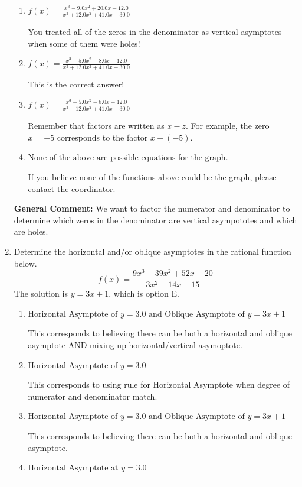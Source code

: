 \documentclass{extbook}[14pt]
\newcommand{\litem}[1]{\item #1

\rule{\textwidth}{0.4pt}}
\begin{document}
\begin{enumerate}
{\begin{enumerate}[label=\Alph*.]
You treated all of the zeros in the denominator as vertical asmptotes when some of them were holes and wrote factors as $x+z$.
\item \( f(x)=\frac{x^{3} -9.0 x^{2} +20.0 x -12.0}{x^{3} +12.0 x^{2} +41.0 x + 30.0} \)

You treated all of the zeros in the denominator as vertical asymptotes when some of them were holes!
\item \( f(x)=\frac{x^{3} +5.0 x^{2} -8.0 x -12.0}{x^{3} +12.0 x^{2} +41.0 x + 30.0} \)

This is the correct answer!
\item \( f(x)=\frac{x^{3} -5.0 x^{2} -8.0 x + 12.0}{x^{3} -12.0 x^{2} +41.0 x -30.0} \)

Remember that factors are written as $x-z$. For example, the zero $x=-5$ corresponds to the factor $x-(-5)$.
\item \( \text{None of the above are possible equations for the graph.} \)

If you believe none of the functions above could be the graph, please contact the coordinator.
\end{enumerate}

\textbf{General Comment:} We want to factor the numerator and denominator to determine which zeros in the denominator are vertical asympototes and which are holes.
}
\litem{
Determine the horizontal and/or oblique asymptotes in the rational function below.
\[ f(x) = \frac{9x^{3} -39 x^{2} +52 x -20}{3x^{2} -14 x + 15} \]The solution is \( y = 3x + 1 \), which is option E.\begin{enumerate}[label=\Alph*.]
\item \( \text{Horizontal Asymptote of } y = 3.0 \text{ and Oblique Asymptote of } y = 3x + 1 \)

This corresponds to believing there can be both a horizontal and oblique asymptote AND mixing up horizontal/vertical asymoptote.
\item \( \text{Horizontal Asymptote of } y = 3.0  \)

This corresponds to using rule for Horizontal Asymptote when degree of numerator and denominator match.
\item \( \text{Horizontal Asymptote of } y = 3.0 \text{ and Oblique Asymptote of } y = 3x + 1 \)

This corresponds to believing there can be both a horizontal and oblique asymptote.
\item \( \text{Horizontal Asymptote at } y = 3.0 \)


\end{enumerate}}
\end{enumerate}
\end{document}
